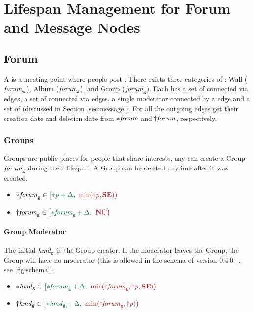 
\section{Lifespan Management for Forum and Message Nodes}

\subsection{Forum}
\label{sec:forum}
\label{sec:hasModerator}

A \tForum is a meeting point where people post \tMessages.
There exists three categories of \tForums:
Wall ($\mathit{forum}_\textsf{w}$),
Album ($\mathit{forum}_\textsf{a}$),
and Group ($\mathit{forum}_\textsf{g}$).
Each \tForum has a set of \tPersons connected via \tHasMember edges, a set of \tTags connected via \tHasTag edges, a single moderator connected by a \tHasModerator edge and a set of \tMessages (discussed in Section \ref{sec:message}).
For all \tForums the outgoing \tHasTag edges get their creation date and deletion date from ${\ast}\mathit{\mathit{forum}}$ and ${\dagger}\mathit{\mathit{forum}}$, respectively.

\subsubsection{Groups}
Groups are public places for people that share interests, any \tPerson can create a Group $\mathit{forum}_\textsf{g}$ during their lifespan. A Group can be deleted anytime after it was created.
\begin{itemize}
    \item $\varc{\eForum}_{\mathsf{g}} \in \interval{\varc{\ePerson} + \Delta}{\min (\vard{\ePerson}, \xSE)}$
    \item $\vard{\eForum}_{\mathsf{g}} \in \interval{\varc{\eForum}_{\mathsf{g}} + \Delta}{\xNC}$
\end{itemize}

\paragraph{Group Moderator}
The initial \tHasModerator $\mathit{hmd}_{\mathsf{g}}$ is the Group creator. If the moderator leaves the Group, the Group will have no moderator (this is allowed in the schema of version 0.4.0+, see \autoref{fig:schema}).
\begin{itemize}
\item $\varc{\eHasModerator}_{\mathsf{g}} \in \interval{\varc{\eForum}_{\mathsf{g}} + \Delta}{\min (\vard{\eForum}_{\mathsf{g}}, \vard{\ePerson}, \xSE)}$
\item $\vard{\eHasModerator}_{\mathsf{g}} \in \interval{ \varc{\eHasModerator}_{\mathsf{g}} + \Delta}{\min (\vard{\eForum}_{\mathsf{g}}, \vard{\ePerson})}$
\end{itemize}

